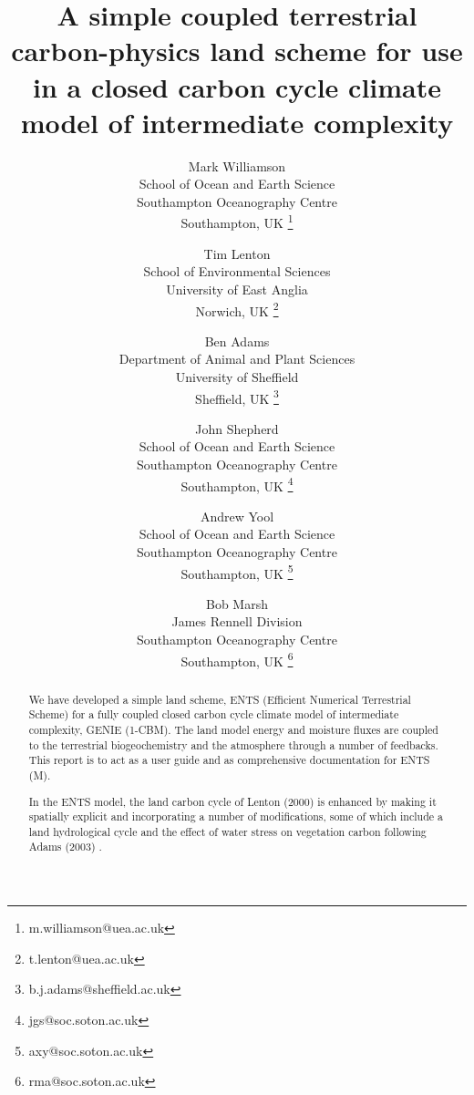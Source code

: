 \documentclass[10pt,a4paper]{report}
\begin{document}
\title{{\bf A simple coupled terrestrial carbon-physics land scheme for use in a
closed carbon cycle climate model of intermediate complexity}}
\author{Mark Williamson \\ School of Ocean and Earth Science \\
Southampton Oceanography Centre \\ Southampton, UK
\thanks{m.williamson@uea.ac.uk} \and Tim Lenton
\\ School of Environmental Sciences \\ University of East Anglia \\ Norwich, UK
\thanks{t.lenton@uea.ac.uk} \and Ben Adams \\ Department of Animal and Plant Sciences \\
University of Sheffield \\ Sheffield, UK
\thanks{b.j.adams@sheffield.ac.uk} \and John Shepherd \\ School of Ocean and Earth Science \\
Southampton Oceanography Centre \\ Southampton, UK
\thanks{jgs@soc.soton.ac.uk}
\and Andrew Yool \\ School of Ocean and Earth Science \\
Southampton Oceanography Centre \\ Southampton, UK
\thanks{axy@soc.soton.ac.uk}
\and Bob Marsh \\ James Rennell Division \\ Southampton
Oceanography Centre
\\ Southampton, UK
\thanks{rma@soc.soton.ac.uk}}
\maketitle

\begin{abstract}

We have developed a simple land scheme, ENTS (Efficient Numerical
Terrestrial Scheme) for a fully coupled closed carbon cycle climate
model of intermediate complexity, GENIE (1-CBM). The land model
energy and moisture fluxes are coupled to the terrestrial
biogeochemistry and the atmosphere through a number of feedbacks.
This report is to act as a user guide and as comprehensive
documentation for ENTS (M).

In the ENTS model, the land carbon cycle of Lenton (2000)
\cite{Lenton} is enhanced by making it spatially explicit and
incorporating a number of modifications, some of which include a
land hydrological cycle and the effect of water stress on vegetation
carbon following Adams (2003) \cite{Adams}.
\end{abstract}
\end{document}
